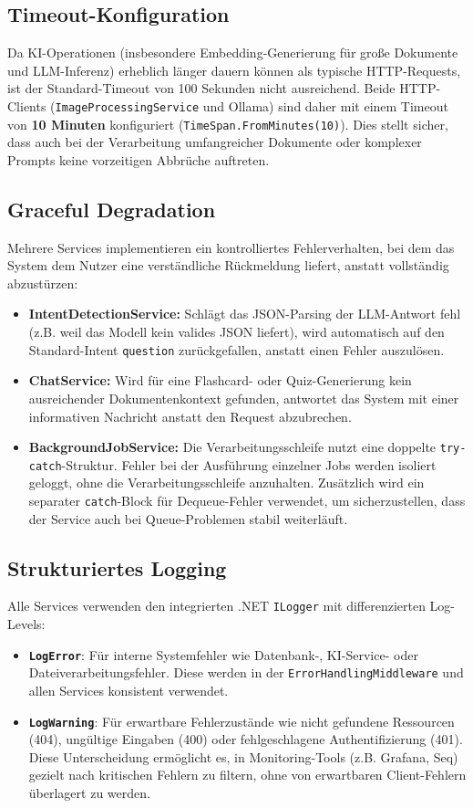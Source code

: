 \subsection{Timeout-Konfiguration}
Da KI-Operationen (insbesondere Embedding-Generierung f\"ur gro\ss{}e Dokumente und LLM-Inferenz) erheblich l\"anger dauern k\"onnen als typische HTTP-Requests, ist der Standard-Timeout von 100 Sekunden nicht ausreichend. Beide HTTP-Clients (\texttt{ImageProcessingService} und Ollama) sind daher mit einem Timeout von \textbf{10 Minuten} konfiguriert (\texttt{TimeSpan.FromMinutes(10)}). Dies stellt sicher, dass auch bei der Verarbeitung umfangreicher Dokumente oder komplexer Prompts keine vorzeitigen Abbrüche auftreten.

\subsection{Graceful Degradation}
Mehrere Services implementieren ein kontrolliertes Fehlerverhalten, bei dem das System dem Nutzer eine verst\"andliche R\"uckmeldung liefert, anstatt vollst\"andig abzust\"urzen:
\begin{itemize}
    \item \textbf{IntentDetectionService:} Schl\"agt das JSON-Parsing der LLM-Antwort fehl (z.B. weil das Modell kein valides JSON liefert), wird automatisch auf den Standard-Intent \texttt{question} zur\"uckgefallen, anstatt einen Fehler auszul\"osen.
    \item \textbf{ChatService:} Wird f\"ur eine Flashcard- oder Quiz-Generierung kein ausreichender Dokumentenkontext gefunden, antwortet das System mit einer informativen Nachricht anstatt den Request abzubrechen.
    \item \textbf{BackgroundJobService:} Die Verarbeitungsschleife nutzt eine doppelte \texttt{try-catch}-Struktur. Fehler bei der Ausf\"uhrung einzelner Jobs werden isoliert geloggt, ohne die Verarbeitungsschleife anzuhalten. Zus\"atzlich wird ein separater \texttt{catch}-Block f\"ur Dequeue-Fehler verwendet, um sicherzustellen, dass der Service auch bei Queue-Problemen stabil weiterl\"auft.
\end{itemize}

\subsection{Strukturiertes Logging}
Alle Services verwenden den integrierten .NET \texttt{ILogger} mit differenzierten Log-Levels:
\begin{itemize}
    \item \textbf{\texttt{LogError}}: F\"ur interne Systemfehler wie Datenbank-, KI-Service- oder Dateiverarbeitungsfehler. Diese werden in der \texttt{ErrorHandlingMiddleware} und allen Services konsistent verwendet.
    \item \textbf{\texttt{LogWarning}}: F\"ur erwartbare Fehlerzust\"ande wie nicht gefundene Ressourcen (404), ung\"ultige Eingaben (400) oder fehlgeschlagene Authentifizierung (401). Diese Unterscheidung erm\"oglicht es, in Monitoring-Tools (z.B. Grafana, Seq) gezielt nach kritischen Fehlern zu filtern, ohne von erwartbaren Client-Fehlern \"uberlagert zu werden.
\end{itemize}
